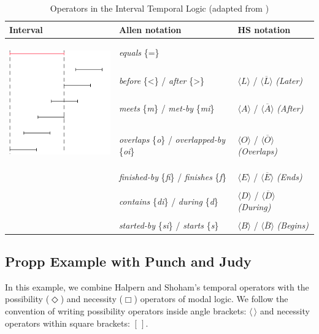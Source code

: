 \documentclass{llncs}
\begin{document}
\begin{table}[]
  \centering
  \caption{Operators in the Interval Temporal Logic (adapted from \cite{della2013interval})}
  \label{tab:itl}
  \begin{tabular}{l|l|l}
    {\bf Interval} & {\bf Allen notation} & {\bf HS notation} \\
    \hline& &\\
    \multirow{7}{*}{\includegraphics[height=2.02in]{intervals.png}}&\emph{equals} \{=\} &\\
    & &\\
                   &\emph{before} \{\textless\} / \emph{after} \{\textgreater\} & $\langle L \rangle$ / $\langle \overline{L} \rangle$ \emph{(Later)}\\
    & &\\
                   &\emph{meets} \{\emph{m}\} / \emph{met-by} \{\emph{mi}\} &$\langle A \rangle$ / $\langle \overline{A} \rangle$ \emph{(After)}\\
    & &\\
    &\emph{overlaps} \{\emph{o}\} / \emph{overlapped-by} \{\emph{oi}\} &$\langle O \rangle$ / $\langle \overline{O} \rangle$ \emph{(Overlaps)}\\
    & &\\
    &\emph{finished-by} \{\emph{fi}\} / \emph{finishes} \{\emph{f}\} &$\langle E \rangle$ / $\langle \overline{E} \rangle$ \emph{(Ends)}\\
    & &\\
    &\emph{contains} \{\emph{di}\} / \emph{during} \{\emph{d}\} &$\langle D \rangle$ / $\langle \overline{D} \rangle$ \emph{(During)}\\
    & &\\
    &\emph{started-by} \{\emph{si}\} / \emph{starts} \{\emph{s}\} &$\langle B \rangle$ / $\langle \overline{B} \rangle$ \emph{(Begins)}
  \end{tabular}
\end{table}
\subsection{Propp Example with Punch and Judy}
In this example, we combine Halpern and Shoham's temporal operators with the possibility ($\Diamond$) and necessity ($\Box$) operators of modal logic. We follow the convention of writing possibility operators inside angle brackets: $\langle \, \rangle$ and necessity operators within square brackets: $[ \, ]$.
\end{document}
